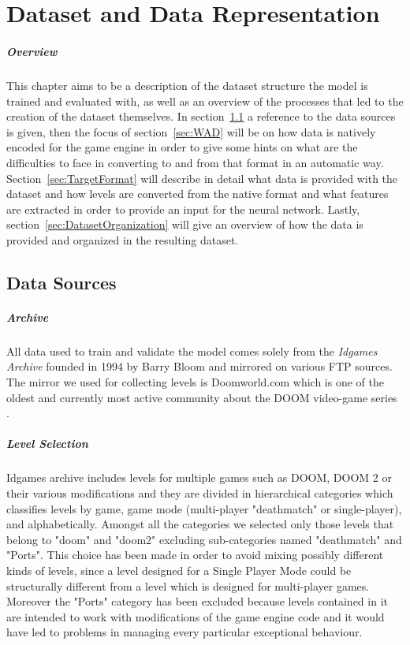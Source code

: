 \chapter{Dataset and Data Representation}
\paragraph{Overview}
This chapter aims to be a description of the dataset structure the model is trained and evaluated with, as well as an overview of the processes that led to the creation of the dataset themselves.
In section~\ref{sec:Sources} a reference to the data sources is given, then the focus of section~\ref{sec:WAD} will be on how data is natively encoded for the game engine in order to give some hints on what are the difficulties to face in converting to and from that format in an automatic way. Section~\ref{sec:TargetFormat} will describe in detail what data is provided with the dataset and how levels are converted from the native format and what features are extracted in order to provide an input for the neural network. Lastly, section~\ref{sec:DatasetOrganization} will give an overview of how the data is provided and organized in the resulting dataset.
 
\section{Data Sources}
\label{sec:Sources}
\paragraph{Archive} All data used to train and validate the model comes solely from the \textit{Idgames Archive} founded in 1994 by Barry Bloom \cite{idarchivehistory} and mirrored on various FTP sources. The mirror we used for collecting levels is Doomworld.com \cite{url:doomworld} which is one of the oldest and currently most active community about the DOOM video-game series \cite{wiki:doomworld}.
\paragraph{Level Selection} Idgames archive includes levels for multiple games such as DOOM, DOOM 2 or their various modifications and they are divided in hierarchical categories which classifies levels by game, game mode (multi-player "deathmatch" or single-player), and alphabetically.
Amongst all the categories we selected only those levels that belong to "doom" and "doom2" excluding sub-categories named "deathmatch" and "Ports". This choice has been made in order to avoid mixing possibly different kinds of levels, since a level designed for a Single Player Mode could be structurally different from a level which is designed for multi-player games. Moreover the "Ports" category has been excluded because levels contained in it are intended to work with modifications of the game engine code and it would have led to problems in managing every particular exceptional behaviour.


